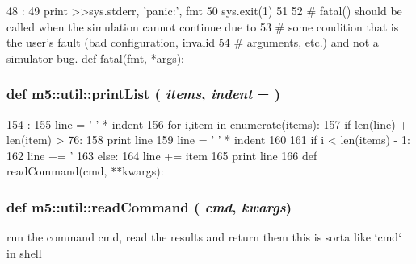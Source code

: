 \begin{DoxyCode}
48                      :
49     print >>sys.stderr, 'panic:', fmt %
50     sys.exit(1)
51 
52 # fatal() should be called when the simulation cannot continue due to
53 # some condition that is the user's fault (bad configuration, invalid
54 # arguments, etc.) and not a simulator bug.
def fatal(fmt, *args):
\end{DoxyCode}
\hypertarget{namespacem5_1_1util_a375ec1766215b51a41c8f07219728164}{
\subsubsection[{printList}]{\setlength{\rightskip}{0pt plus 5cm}def m5::util::printList ( {\em items}, \/   {\em indent} = {})}}
\label{namespacem5_1_1util_a375ec1766215b51a41c8f07219728164}



\begin{DoxyCode}
154                               :
155     line = ' ' * indent
156     for i,item in enumerate(items):
157         if len(line) + len(item) > 76:
158             print line
159             line = ' ' * indent
160 
161         if i < len(items) - 1:
162             line += '%
163         else:
164             line += item
165             print line
166 
def readCommand(cmd, **kwargs):
\end{DoxyCode}
\hypertarget{namespacem5_1_1util_a9c9d966763727d2b9e9311eae3d8f112}{
\subsubsection[{readCommand}]{\setlength{\rightskip}{0pt plus 5cm}def m5::util::readCommand ( {\em cmd}, \/   {\em kwargs})}}
\label{namespacem5_1_1util_a9c9d966763727d2b9e9311eae3d8f112}
\begin{DoxyVerb}run the command cmd, read the results and return them
this is sorta like `cmd` in shell\end{DoxyVerb}
 


